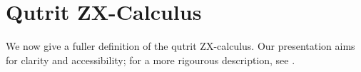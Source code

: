 \section{Qutrit ZX-Calculus}\label{app:qutrit_zx_calculus}


We now give a fuller definition of the qutrit ZX-calculus. Our presentation aims for clarity and accessibility; for a more rigourous description, see \cite{harny_completeness}.

